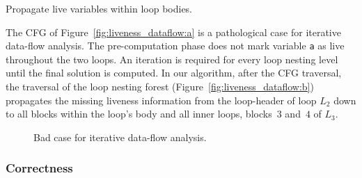 \begin{algorithm}[H]
  \caption{Propagate live variables within loop bodies.}
  \label{alg:loop_dfs}
\end{algorithm}

\begin{example}
	The CFG of Figure~\ref{fig:liveness_dataflow:a} is a pathological case for iterative data-flow analysis.
	The pre-computation phase does not mark variable \texttt{a} as live throughout the two loops.
	An iteration is required for every loop nesting level until the final solution is computed.
	In our algorithm, after the CFG traversal, the traversal of the loop nesting forest (Figure~\ref{fig:liveness_dataflow:b}) propagates the missing liveness information from the loop-header of loop $L_2$ down to all blocks within the loop's body and all inner loops, \ie blocks~$3$ and~$4$ of $L_3$.
\end{example}

\begin{figure}[t]
   \begin{center}
   \end{center}
   \caption{Bad case for iterative data-flow analysis.}
   \label{fig:liveness_dataflow}
\end{figure}


\subsubsection{Correctness}
\label{sec:correctnessdebase}

